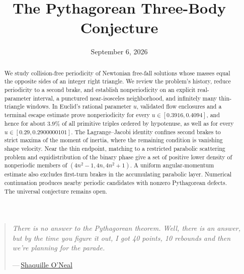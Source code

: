 \documentclass[11pt]{article}
\title{The Pythagorean Three-Body Conjecture}
\author{}
\date{September 6, 2026}
\theoremstyle{remark}
\theoremstyle{plain}
\begin{document}
\maketitle
\begin{abstract}
We study collision-free periodicity of Newtonian free-fall solutions whose
masses equal the opposite sides of an integer right triangle. We review the
problem's history, reduce periodicity to a second brake, and establish
nonperiodicity on an explicit real-parameter interval, a punctured
near-isosceles neighborhood, and infinitely many thin-triangle windows.
In Euclid's rational parameter $u$, validated flow enclosures and a terminal
escape estimate prove nonperiodicity for every
$u\in[0.3916,0.4094]$, and hence for about $3.9\%$ of all primitive
triples ordered by hypotenuse, as well as for every $u\in[0.29,0.2900000101]$. The Lagrange--Jacobi identity confines second
brakes to strict maxima of the moment of inertia, where the remaining
condition is vanishing shape velocity. Near the thin endpoint, matching to
a restricted parabolic scattering problem and equidistribution of the
binary phase give a set of positive lower density of nonperiodic members
of $(4n^2-1,4n,4n^2+1)$. A uniform angular-momentum estimate also excludes
first-turn brakes in the accumulating parabolic layer. Numerical
continuation produces nearby periodic candidates with nonzero Pythagorean
defects. The universal conjecture remains open.
\end{abstract}
\vspace{\baselineskip}
{\small
\begin{quote}
\raggedright\itshape
There is no answer to the Pythagorean theorem. Well, there is an answer,
but by the time you figure it out, I got 40 points, 10 rebounds and then
we're planning for the parade.
\par\smallskip
\normalfont\raggedleft
{\hypersetup{urlcolor=black}---\,\href{https://www.brainyquote.com/quotes/shaquille_oneal_461213}{Shaquille O'Neal}}
\end{quote}
}










\end{document}
